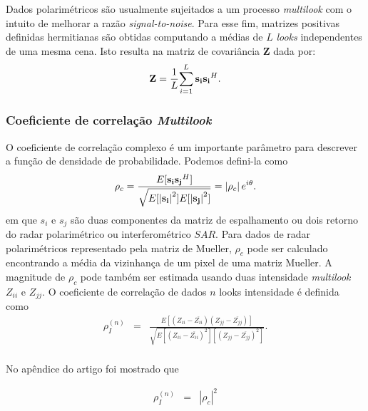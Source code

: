 \documentclass[12pt,a4paper]{article}
\begin{document}
Dados polarimétricos são usualmente sujeitados a um processo {\it multilook} com o intuito de melhorar a razão {\it signal-to-noise}.
Para esse fim, matrizes positivas definidas hermitianas são obtidas computando a médias de $L$ {\it looks} 
independentes de uma mesma cena. Isto resulta na matriz de covariância {\bf Z} dada por:
\begin{equation}\label{sec1eqn7}
	{\bf Z}=\frac{1}{L}{\sum_{i=1}^{L} {\bf s_i}{\bf s_i}^H} .
\end{equation}

\subsubsection{Coeficiente de correlação {\it Multilook}}

O coeficiente de correlação complexo é um importante parâmetro para descrever a função de densidade de probabilidade. 
Podemos defini-la como
\begin{equation}\label{sec1eqn8}
	\rho_c=\frac{E[{\bf s_i}{\bf s_j}^H]}{\sqrt{E[\left|{\bf s_i}\right|^2]E[\left|{\bf s_j}\right|^2]}} =\left|\rho_c\right|e^{i\theta}.
\end{equation}
em que {\bf $s_i$} e {\bf $s_j$} 
são duas componentes da matriz de espalhamento ou dois retorno do radar polarimétrico ou interferométrico $SAR$. Para dados de radar polarimétricos representado pela matriz de Mueller, $\rho_c$ pode ser calculado encontrando a média da vizinhança de um pixel de uma matriz Mueller. A magnitude de $\rho_c$ pode também ser estimada usando duas intensidade  {\it multilook} $Z_{ii}$ e $Z_{jj}$. O coeficiente de correlação de dados $n$ looks intensidade é definida como   
\begin{equation}\label{sec1eqn9}
\begin{array}{ccc}
	\rho_I^{(n)}&=&\frac{E[(Z_{ii}-\overline{Z_{ii}})(Z_{jj}-\overline{Z_{jj}})]}{\sqrt{E[(Z_{ii}-\overline{Z_{ii}})^2][(Z_{jj}-\overline{Z_{jj}})^2]}}. \\
\end{array}
\end{equation}

No apêndice do artigo \cite{lee94} foi mostrado que 

\begin{equation}\label{sec1eqn10}
\begin{array}{ccc}
	\rho_I^{(n)}&=& \left|\rho_c\right|^2\\
\end{array}
\end{equation}
\end{document}
